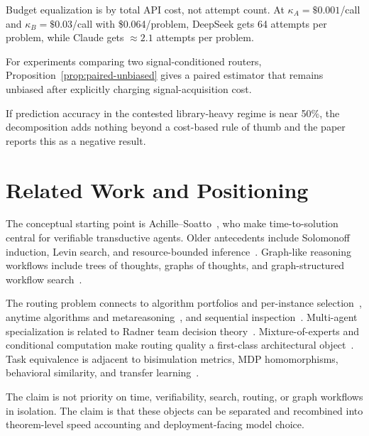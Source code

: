 \documentclass[10pt]{article}
\theoremstyle{paperplain}
\theoremstyle{paperdefinition}
\theoremstyle{paperremark}
\begin{document}
Budget equalization is by total API cost, not attempt count. At $\kappa_A=\$0.001$/call and $\kappa_B=\$0.03$/call with \$0.064/problem, DeepSeek gets 64 attempts per problem, while Claude gets $\approx 2.1$ attempts per problem.

For experiments comparing two signal-conditioned routers, Proposition~\ref{prop:paired-unbiased} gives a paired estimator that remains unbiased after explicitly charging signal-acquisition cost.

If prediction accuracy in the contested library-heavy regime is near 50\%, the decomposition adds nothing beyond a cost-based rule of thumb and the paper reports this as a negative result.

\section{Related Work and Positioning}
\label{sec:related}

The conceptual starting point is Achille--Soatto~\cite{achille2026}, who make time-to-solution central for verifiable transductive agents. Older antecedents include Solomonoff induction, Levin search, and resource-bounded inference~\cite{solomonoff1964,levin1973,livitanyi2008,levin_1984_randomness_conservation,schmidhuber_2002_speed_prior}. Graph-like reasoning workflows include trees of thoughts, graphs of thoughts, and graph-structured workflow search~\cite{yao_2023_tree_of_thoughts,besta_2023_graph_of_thoughts,zhang_2024_aflow}.

The routing problem connects to algorithm portfolios and per-instance selection~\cite{huberman_lukose_hogg_1997_economics_hard,xu_hutter_hoos_leytonbrown_2008_satzilla}, anytime algorithms and metareasoning~\cite{zilberstein_1996_anytime_systems,hansen_2001_monitoring_anytime,russell_wefald_1991_dotherightthing}, and sequential inspection~\cite{weitzman1979,wald1947,chernoff1959}. Multi-agent specialization is related to Radner team decision theory~\cite{radner1962,marschak_radner_1972}. Mixture-of-experts and conditional computation make routing quality a first-class architectural object~\cite{jordan_jacobs_1994_hme,shazeer_2017_moe,fedus_zoph_shazeer_2022_switch}. Task equivalence is adjacent to bisimulation metrics, MDP homomorphisms, behavioral similarity, and transfer learning~\cite{ferns2004,ravindran2003,agarwal2021,taylor2009}.

The claim is not priority on time, verifiability, search, routing, or graph workflows in isolation. The claim is that these objects can be separated and recombined into theorem-level speed accounting and deployment-facing model choice.
\end{document}
